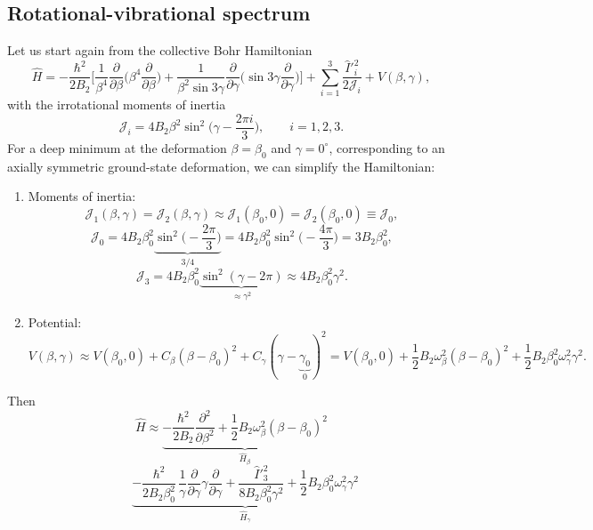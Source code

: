 \documentclass[11pt,a4paper]{article}
\newcommand{\op}[1]{\hat{#1}}
\begin{document}
\subsection{Rotational-vibrational spectrum}
Let us start again from the collective Bohr Hamiltonian
\[
\op H=-\frac{\hbar^2}{2B_2}\Big[\frac{1}{\beta^4}\frac{\partial}{\partial\beta}\Big(\beta^4\frac{\partial}{\partial\beta}\Big)
+\frac{1}{\beta^2\sin3\gamma}\frac{\partial}{\partial\gamma}\Big(\sin3\gamma\frac{\partial}{\partial\gamma}\Big)\Big]
+\sum_{i=1}^3\frac{\op I'^2_i}{2\mathcal J_i}+V(\beta,\gamma),
\]
with the irrotational moments of inertia
\[
\mathcal J_i=4B_2\beta^2\sin^2\Big(\gamma-\frac{2\pi i}{3}\Big),\qquad i=1,2,3 .
\]
For a deep minimum at the deformation $\beta=\beta_0$ and $\gamma=0^\circ$, corresponding to an axially symmetric ground-state deformation, we can simplify the Hamiltonian:
\begin{center}
\end{center}
\begin{enumerate}
\item Moments of inertia:
\[
\mathcal J_1(\beta,\gamma)=\mathcal J_2(\beta,\gamma)\approx\mathcal J_1(\beta_0,0)=\mathcal J_2(\beta_0,0)\equiv\mathcal J_0,
\]
\[
\mathcal J_0=4B_2\beta_0^2\underbrace{\sin^2\Big(-\frac{2\pi}{3}\Big)}_{3/4}=4B_2\beta_0^2\sin^2\Big(-\frac{4\pi}{3}\Big)=3B_2\beta_0^2,
\]
\[
\mathcal J_3=4B_2\beta_0^2\underbrace{\sin^2(\gamma-2\pi)}_{\approx\gamma^2}\approx4B_2\beta_0^2\gamma^2 .
\]
\item Potential:
\[
V(\beta,\gamma)\approx V(\beta_0,0)+C_\beta(\beta-\beta_0)^2+C_\gamma(\gamma-\underbrace{\gamma_0}_{0})^2
=V(\beta_0,0)+\frac12B_2\omega_\beta^2(\beta-\beta_0)^2+\frac12B_2\beta_0^2\omega_\gamma^2\gamma^2 .
\]
\end{enumerate}
Then
\[
\op H\approx\underbrace{-\frac{\hbar^2}{2B_2}\frac{\partial^2}{\partial\beta^2}+\frac12B_2\omega_\beta^2(\beta-\beta_0)^2}_{\op H_\beta}
\]
\[
\qquad\ \underbrace{-\frac{\hbar^2}{2B_2\beta_0^2}\,\frac1\gamma\frac{\partial}{\partial\gamma}\gamma\frac{\partial}{\partial\gamma}+\frac{\op I'^2_3}{8B_2\beta_0^2\gamma^2}+\frac12B_2\beta_0^2\omega_\gamma^2\gamma^2}_{\op H_\gamma}
\]
\end{document}
